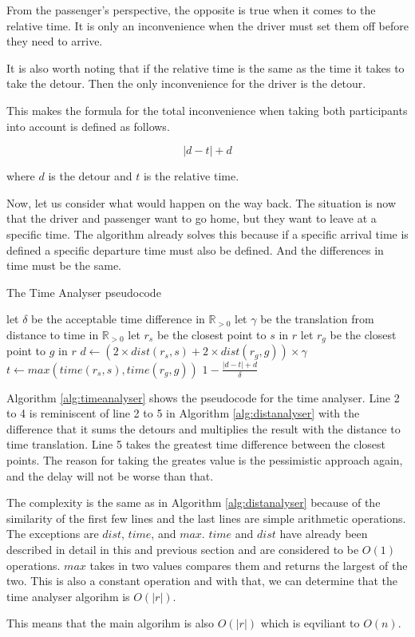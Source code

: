 From the passenger's perspective, the opposite is true when it comes to the relative time. 
It is only an inconvenience when the driver must set them off before they need to arrive.

It is also worth noting that if the relative time is the same as the time it takes to take the detour.
Then the only inconvenience for the driver is the detour.

This makes the formula for the total inconvenience when taking both participants into account is defined as follows.

\[ |d - t| + d \]

where $d$ is the detour and $t$ is the relative time.

Now, let us consider what would happen on the way back.
The situation is now that the driver and passenger want to go home, but they want to leave at a specific time.
The algorithm already solves this because if a specific arrival time is defined a specific departure time must also be defined.
And the differences in time must be the same.

\begin{algorithm}
	\caption{The Time Analyser pseudocode}
	\label{alg:timeanalyser}
	\begin{algorithmic}[1]
		\Require 
		\Statex let $\delta$ be the acceptable time difference in $\mathbb{R}_{>0}$
		\Statex let $\gamma$ be the translation from distance to time in $\mathbb{R}_{>0}$ 
		\Statex 
			\State let $r_s$ be the closest point to $s$ in $r$
			\State let $r_g$ be the closest point to $g$ in $r$
			\State $d \gets (2\times dist(r_s,s) + 2\times dist(r_g,g))\times\gamma$
			\State $t \gets max(time(r_s, s), time(r_g, g))$
			\State\Return $1-\frac{|d - t| + d}{\delta}$
		\EndFunction
	\end{algorithmic}
\end{algorithm}

Algorithm \ref{alg:timeanalyser} shows the pseudocode for the time analyser.
Line 2 to 4 is reminiscent of line 2 to 5 in Algorithm \ref{alg:distanalyser} with the difference that it sums the detours and multiplies the result with the distance to time translation.
Line 5 takes the greatest time difference between the closest points.
The reason for taking the greates value is the pessimistic approach again, and the delay will not be worse than that.

The complexity is the same as in Algorithm \ref{alg:distanalyser} because of the similarity of the first few lines and the last lines are simple arithmetic operations. 
The exceptions are $dist$, $time$, and $max$. 
$time$ and $dist$ have already been described in detail in this and previous section and are considered to be $O(1)$ operations.
$max$ takes in two values compares them and returns the largest of the two.
This is also a constant operation and with that, we can determine that the time analyser algorihm is $O(|r|)$.

This means that the main algorihm is also $O(|r|)$ which is eqviliant to $O(n)$.
